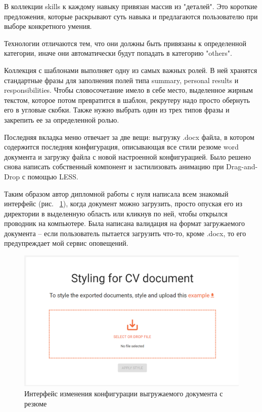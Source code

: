 \documentclass[14pt, a4paper]{diplom}
\begin{document}
В коллекции skills к каждому навыку привязан массив из "деталей". Это короткие предложения, которые раскрывают суть навыка и предлагаются пользователю при выборе конкретного умения.

Технологии отличаются тем, что они должны быть привязаны к определенной категории, иначе они автоматически будут попадать в категорию "others".

Коллекция с шаблонами выполняет одну из самых важных ролей. В ней хранятся стандартные фразы для заполнения полей типа summary, personal results и responsibilities. Чтобы словосочетание имело в себе место, выделенное жирным текстом, которое потом превратится в шаблон, рекрутеру надо просто обернуть его в угловые скобки.
Также нужно выбрать один из трех типов фразы и закрепить ее за определенной ролью.

Последняя вкладка меню отвечает за две вещи: выгрузку .docx файла, в котором содержится последняя конфигурация, описывающая все стили резюме word документа и загрузку файла с новой настроенной конфигурацией.
Было решено снова написать собственный компонент и застилизовать анимацию при Drag-and-Drop с помощью LESS.


Таким образом автор дипломной работы с нуля написала всем знакомый интерфейс (рис. ~\ref{20}), когда документ можно загрузить, просто опуская его из директории в выделенную область или кликнув по ней, чтобы открылся проводник на компьютере. Была написана валидация на формат загружаемого документа -- если пользователь пытается загрузить что-то, кроме .docx, то его предупреждает мой сервис оповещений.

\begin{figure}[!ht]
\centering
\includegraphics[width=1\textwidth]{resources/doc.png}
\caption{Интерфейс изменения конфигурации выгружаемого документа с резюме}
\label{20}
\end{figure}
\end{document}
